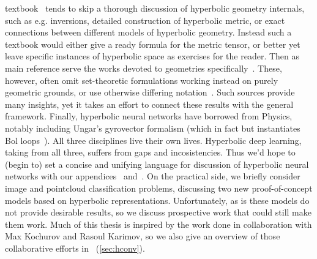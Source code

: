 textbook~\cite{leeRiem,leeSmooth} tends to skip a thorough discussion of
hyperbolic geometry internals, such as e.g.  inversions, detailed
construction of hyperbolic metric, or exact connections between different
models of hyperbolic geometry. Instead such a textbook would either give a
ready formula for the metric tensor, or better yet leave specific instances of
hyperbolic space as exercises for the reader. Then as main reference serve the
works devoted to geometries specifically~\cite{thurstonThree}.
These, however, often omit set-theoretic formulations working instead on purely
geometric grounds, or use otherwise differing
notation~\cite{beardonGeometryDiscrete}. Such sources provide many insights,
yet it takes an effort to connect these results with the general framework.
Finally, hyperbolic neural networks have borrowed from Physics, notably
including Ungar's gyrovector formalism (which in fact but instantiates Bol
loops~\cite{sabinin1995gyrogroups}).  All three disciplines live their own
lives. Hyperbolic deep learning, taking from all three, suffers from gaps and
incosistencies. Thus we'd hope to (begin to) set a concise and unifying
language for discussion of hyperbolic neural networks with our
appendices~ and~.  On
the practical side, we briefly consider image and pointcloud classification
problems, discussing two new proof-of-concept models based on hyperbolic
representations.  Unfortunately, as is these models do not provide desirable
results, so we discuss prospective work that could still make them work.  Much
of this thesis is inspired by the work done in collaboration with Max Kochurov
and Rasoul Karimov, so we also give an overview of those collaborative efforts
in ~(\autoref{sec:hconv}).
